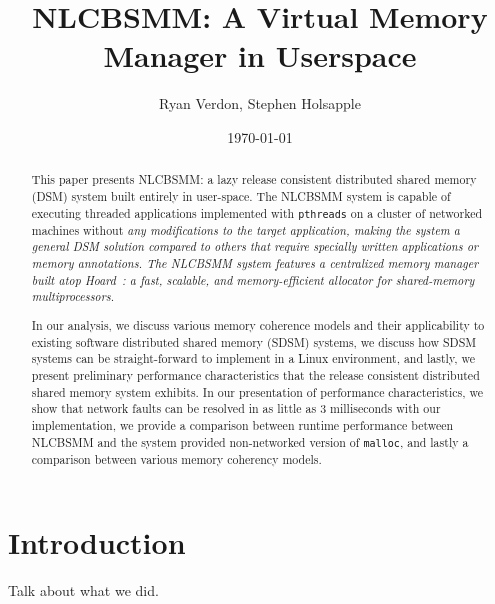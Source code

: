\documentclass[10pt,conference]{IEEEtran}
\begin{document}
\title{\vfill NLCBSMM: A Virtual Memory Manager in Userspace} 
\author{Ryan Verdon, Stephen Holsapple}
\date{\today}
\maketitle

\def \projname {NLCBSMM}
\newtheorem{definition}{Definition}[section]
\newtheorem{condition}{Condition}[section]

\begin{abstract}
This paper presents \projname{}: a lazy release consistent distributed shared memory (DSM) system built entirely in user-space.  The \projname{} system is capable of executing threaded applications implemented with \verb,pthreads, on a cluster of networked machines without \em any \em modifications to the target application, making the system a general DSM solution compared to others that require specially written applications or memory annotations.  The \projname{} system features a centralized memory manager~\cite{Li:1989:MCS:75104.75105} built atop Hoard~\cite{Berger:1999:HFS:899944, Berger:2000:HSM:356989.357000}: a fast, scalable, and memory-efficient allocator for shared-memory multiprocessors.

In our analysis, we discuss various memory coherence models and their applicability to existing software distributed shared memory (SDSM) systems, we discuss how SDSM systems can be straight-forward to implement in a Linux environment, and lastly, we present preliminary performance characteristics that the release consistent distributed shared memory system exhibits.  In our presentation of performance characteristics, we show that network faults can be resolved in as little as 3 milliseconds with our implementation, we provide a comparison between runtime performance between \projname{} and the system provided non-networked version of \verb,malloc,, and lastly a comparison between various memory coherency models.

\end{abstract}

\section{Introduction}

Talk about what we did.










\end{document}
